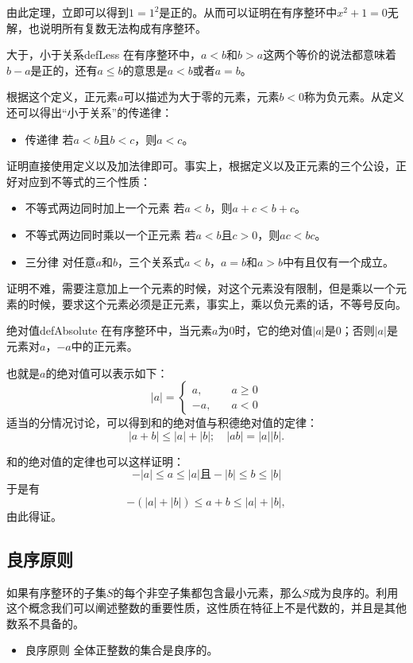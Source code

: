 由此定理，立即可以得到$1=1^2$是正的。从而可以证明在有序整环中$x^2+1=0$无解，也说明所有复数无法构成有序整环。

\begin{definition}{大于，小于关系}{defLess}
在有序整环中，$a<b$和$b>a$这两个等价的说法都意味着$b-a$是正的，还有$a \le b$的意思是$a<b$或者$a=b$。
\end{definition}
根据这个定义，正元素$a$可以描述为大于零的元素，元素$b<0$称为负元素。从定义还可以得出“小于关系”的传递律：
\begin{itemize}
\item 传递律 若$a < b$且$b<c$，则$a<c$。
\end{itemize}

证明直接使用定义以及加法律即可。事实上，根据定义以及正元素的三个公设，正好对应到不等式的三个性质：
\begin{itemize}
\item 不等式两边同时加上一个元素 若$a < b$，则$a+c < b+c$。
\item 不等式两边同时乘以一个正元素 若$a < b$且$c > 0$，则$ac < bc$。
\item 三分律 对任意$a$和$b$，三个关系式$a<b$，$a=b$和$a>b$中有且仅有一个成立。
\end{itemize}

证明不难，需要注意加上一个元素的时候，对这个元素没有限制，但是乘以一个元素的时候，要求这个元素必须是正元素，事实上，乘以负元素的话，不等号反向。

\begin{definition}{绝对值}{defAbsolute}
在有序整环中，当元素$a$为0时，它的绝对值$|a|$是0；否则$|a|$是元素对$a$，$-a$中的正元素。
\end{definition}
也就是$a$的绝对值可以表示如下： 
\[
|a| = \left\{
\begin{aligned}
a, &\quad a \ge 0 \\
-a, &\quad a < 0
\end{aligned}
\right.
\]
适当的分情况讨论，可以得到和的绝对值与积德绝对值的定律： 
\begin{equation}
|a+b| \le |a| + |b|; \quad |ab|=|a||b|.
\end{equation}

和的绝对值的定律也可以这样证明：
\[
-|a| \le a \le |a| \text{且} -|b| \le b \le |b|
\]
于是有
\[
-(|a|+|b|) \le  a + b \le |a|+|b|,
\]
由此得证。

\subsection{良序原则}
如果有序整环的子集$S$的每个非空子集都包含最小元素，那么$S$成为良序的。利用这个概念我们可以阐述整数的重要性质，这性质在特征上不是代数的，并且是其他数系不具备的。
\begin{itemize}
\item 良序原则 全体正整数的集合是良序的。
\end{itemize}

